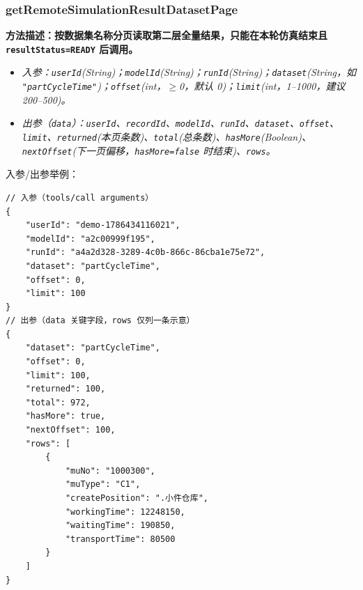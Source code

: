 \subsubsection{getRemoteSimulationResultDatasetPage}
\bf{方法描述}：按数据集名称分页读取第二层全量结果，只能在本轮仿真结束且 \texttt{resultStatus=READY} 后调用。
\begin{itemize}
	\item \it{入参}：\texttt{userId}(String)；\texttt{modelId}(String)；\texttt{runId}(String)；\texttt{dataset}(String，如 \texttt{"partCycleTime"})；\texttt{offset}(int，$\geq$0，默认 0)；\texttt{limit}(int，1--1000，建议 200--500)。
	\item \it{出参}（\texttt{data}）：\texttt{userId}、\texttt{recordId}、\texttt{modelId}、\texttt{runId}、\texttt{dataset}、\texttt{offset}、\texttt{limit}、\texttt{returned}(本页条数)、\texttt{total}(总条数)、\texttt{hasMore}(Boolean)、\texttt{nextOffset}(下一页偏移，\texttt{hasMore=false} 时结束)、\texttt{rows}。
\end{itemize}
入参/出参举例：
\begin{lstlisting}
// 入参（tools/call arguments）
{
    "userId": "demo-1786434116021",
    "modelId": "a2c00999f195",
    "runId": "a4a2d328-3289-4c0b-866c-86cba1e75e72",
    "dataset": "partCycleTime",
    "offset": 0,
    "limit": 100
}
// 出参（data 关键字段，rows 仅列一条示意）
{
    "dataset": "partCycleTime",
    "offset": 0,
    "limit": 100,
    "returned": 100,
    "total": 972,
    "hasMore": true,
    "nextOffset": 100,
    "rows": [
        {
            "muNo": "1000300",
            "muType": "C1",
            "createPosition": ".小件仓库",
            "workingTime": 12248150,
            "waitingTime": 190850,
            "transportTime": 80500
        }
    ]
}
\end{lstlisting}\vspace{-30pt}

